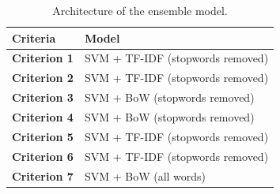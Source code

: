\documentclass[a4paper,twoside,phd]{BYUPhys}
\begin{document}
\begin{table}[H]
	\centering
	\caption{Architecture of the ensemble model.}
	\begin{tabular}{|p{4.2cm}|p{5cm}|}
		\hline
		
		\textbf{Criteria} & \textbf{Model}                                                                                                                                                                                                                                                                                                                                                    \\
		\hline                                                                                                                                              
		
		\textbf{Criterion 1}  & SVM + TF-IDF (stopwords removed)  \\
		\hline
		
		\textbf{Criterion 2} & SVM + TF-IDF (stopwords removed)  \\
		\hline
		
		\textbf{Criterion 3} & SVM + BoW (stopwords removed) \\
		\hline
		
		\textbf{Criterion 4} & SVM + BoW (stopwords removed) \\
		\hline
		
		\textbf{Criterion 5}  & SVM + TF-IDF (stopwords removed)  \\
		\hline
		
		\textbf{Criterion 6} & SVM + TF-IDF (stopwords removed)  \\
		\hline
		
		\textbf{Criterion 7} & SVM + BoW (all words) \\
		\hline
		                                                   		
	\end{tabular}
	\label{table:EnsembleModel}
\end{table}
\end{document}
